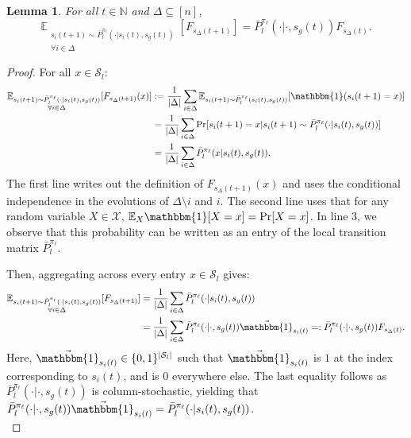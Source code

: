 \documentclass{article}
\theoremstyle{plain}
\newtheorem{lemma}[theorem]{Lemma}
\theoremstyle{definition}
\def\E{\mathbb{E}}
\def\N{\mathbb{N}}
\begin{document}
\begin{lemma} \label{lemma: linear_transition}For all $t\in\N$ and $\Delta\subseteq[n]$,
    \[    \E_{\substack{s_i({t+1})\sim \bar{P}^{\pi_\ell}_l(\cdot|s_i(t), s_g(t))\\ \forall i\in\Delta}} [F_{s_\Delta({t+1})}] = \bar{P}^{\pi_\ell}_l(\cdot|\cdot,s_g(t))F_{s_\Delta(t)}.\]
\end{lemma}
\begin{proof} 
For all  $x\in\mathcal{S}_l$:
\begin{align*}
\E_{\substack{s_i({t+1})\sim \bar{P}^{\pi_\ell}_l(\cdot|s_i(t), s_g(t))\\ \forall i\in\Delta}} [F_{s_\Delta({t+1})}(x)] &:= \frac{1}{|\Delta|}\sum_{i\in\Delta}\E_{s_i({t+1})\sim \bar{P}^{\pi_\ell}_l(s_i(t),s_g(t))}[\mathbbm{1}(s_i({t+1})=x)] \\
&= \frac{1}{|\Delta|}\sum_{i\in\Delta}\Pr[s_i({t+1}) = x|s_i({t+1})\sim \bar{P}^{\pi_\ell}_l(\cdot|s_i(t),s_g(t))]  \\
&= \frac{1}{|\Delta|}\sum_{i\in\Delta}\bar{P}^{\pi_\ell}_l(x|s_i(t),s_g(t)) .
\end{align*}
The first line writes out the definition of $F_{s_\Delta({t+1})}(x)$ and uses the conditional independence in the evolutions of $\Delta\setminus i$ and $i$. The second line uses that for any random variable $X\in\mathcal{X}$, $\E_{X}\mathbbm{1}[X=x] = \Pr[X=x]$. In line 3, we observe that this probability can be written as an entry of the local transition matrix $\bar{P}^{\pi_\ell}_l$. 

Then, aggregating across every entry $x\in\mathcal{S}_l$ gives:
\begin{align*}
\E_{\substack{s_i({t+1})\sim \bar{P}^{\pi_\ell}_l(\cdot|s_i(t), s_g(t))\\ \forall i\in\Delta}}[F_{s_\Delta({t+1})}] &= \frac{1}{|\Delta|}\sum_{i\in\Delta}\bar{P}^{\pi_\ell}_l(\cdot|s_i(t),s_g(t)) \\
&= \frac{1}{|\Delta|}\sum_{i\in\Delta}\bar{P}^{\pi_\ell}_l(\cdot|\cdot,s_g(t))\vec{\mathbbm{1}}_{s_i(t)} =: \bar{P}^{\pi_\ell}_l(\cdot|\cdot,s_g(t)) F_{s_\Delta(t)}.
\end{align*}
Here, $\vec{\mathbbm{1}}_{s_i(t)}\in  \{0,1\}^{|\mathcal{S}_l|}$ such that $\vec{\mathbbm{1}}_{s_i(t)}$ is $1$ at the index corresponding to $s_i(t)$, and is $0$ everywhere else. The last equality follows as $\bar{P}^{\pi_\ell}_l(\cdot|\cdot,s_g(t))$ is  column-stochastic, yielding that $\bar{P}^{\pi_\ell}_l(\cdot|\cdot,s_g(t))\vec{\mathbbm{1}}_{s_i(t)}=\bar{P}^{\pi_\ell}_l(\cdot|s_i(t),s_g(t)) $.\qedhere\\
\end{proof}
 
\end{document}
